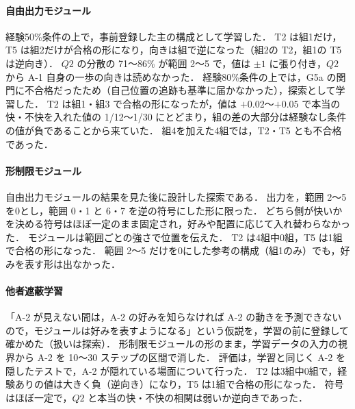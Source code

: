 \begin{table}[t]
  \centering
  \small
  \caption{他者用モジュールの各構成の結果}
  \label{tab:module}
  
\end{table}

\paragraph{自由出力モジュール}
経験50\%条件の上で，事前登録した主の構成として学習した．
T2 は組1だけ，T5 は組2だけが合格の形になり，向きは組で逆になった（組2の T2，組1の T5 は逆向き）．
$Q2$ の分散の 71〜86\% が範囲 2〜5 で，値は $\pm1$ に張り付き，$Q2$ から A-1 自身の一歩の向きは読めなかった．
経験80\%条件の上では，G5a の関門に不合格だったため（自己位置の追跡も基準に届かなかった），探索として学習した．
T2 は組1・組3 で合格の形になったが，値は $+0.02$〜$+0.05$ で本当の快・不快を入れた値の 1/12〜1/30 にとどまり，組の差の大部分は経験なし条件の値が負であることから来ていた．
組4を加えた4組では，T2・T5 とも不合格であった．

\paragraph{形制限モジュール}
自由出力モジュールの結果を見た後に設計した探索である．
出力を，範囲 2〜5 を0とし，範囲 0・1 と 6・7 を逆の符号にした形に限った．
どちら側が快いかを決める符号はほぼ一定のまま固定され，好みや配置に応じて入れ替わらなかった．
モジュールは範囲ごとの強さで位置を伝えた．
T2 は4組中0組，T5 は1組で合格の形になった．
範囲 2〜5 だけを0にした参考の構成（組1のみ）でも，好みを表す形は出なかった．

\paragraph{他者遮蔽学習}
「A-2 が見えない間は，A-2 の好みを知らなければ A-2 の動きを予測できないので，モジュールは好みを表すようになる」という仮説を，学習の前に登録して確かめた（扱いは探索）．
形制限モジュールの形のまま，学習データの入力の視界から A-2 を 10〜30 ステップの区間で消した．
評価は，学習と同じく A-2 を隠したテストで，A-2 が隠れている場面について行った．
T2 は3組中0組で，経験ありの値は大きく負（逆向き）になり，T5 は1組で合格の形になった．
符号はほぼ一定で，$Q2$ と本当の快・不快の相関は弱いか逆向きであった．

